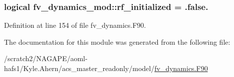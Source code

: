 \subsubsection[{rf\-\_\-initialized}]{\setlength{\rightskip}{0pt plus 5cm}logical fv\-\_\-dynamics\-\_\-mod\-::rf\-\_\-initialized = .false.}\label{classfv__dynamics__mod_a93c42e85cca69658841e13e403c3c89a}


Definition at line 154 of file fv\-\_\-dynamics.\-F90.



The documentation for this module was generated from the following file\-:\begin{DoxyCompactItemize}
\item 
/scratch2/\-N\-A\-G\-A\-P\-E/aoml-\/hafs1/\-Kyle.\-Ahern/acs\-\_\-master\-\_\-readonly/model/\hyperlink{fv__dynamics_8F90}{fv\-\_\-dynamics.\-F90}\end{DoxyCompactItemize}
